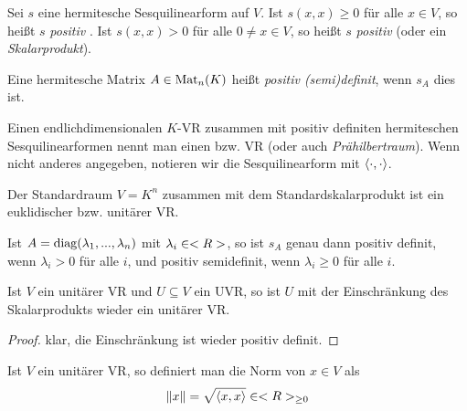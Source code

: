 \begin{definition}
	Sei $s$ eine hermitesche Sesquilinearform auf $V$. Ist $s(x,x)\ge 0$ für alle $x\in V$, so heißt $s$ \emph{positiv} . Ist $s(x,x)>0$ für alle $0\neq x\in V$, so heißt $s$ \emph{positiv}  (oder ein \emph{Skalarprodukt}).
	
	Eine hermitesche Matrix $A\in\operatorname{Mat}_n(K)$ heißt \emph{positiv (semi)definit}, wenn $s_A$ dies ist.
	
	Einen endlichdimensionalen $K$-VR zusammen mit positiv definiten hermiteschen Sesquilinearformen nennt man einen  bzw.  VR (oder auch \emph{Prähilbertraum}). Wenn nicht anderes angegeben, notieren wir die Sesquilinearform mit $\left\langle \cdot,\cdot\right\rangle$.
\end{definition}

\begin{example}
	Der Standardraum $V=K^n$ zusammen mit dem Standardskalarprodukt ist ein euklidischer bzw. unitärer VR.
\end{example}

\begin{example}
	Ist $A=\operatorname{diag}(\lambda_1,...,\lambda_n)$ mit $\lambda_i\in<R>$, so ist $s_A$ genau dann positiv definit, wenn $\lambda_i>0$ für alle $i$, und positiv semidefinit, wenn $\lambda_i\ge 0$ für alle $i$.
\end{example}

\begin{proposition}
	Ist $V$ ein unitärer VR und $U\subseteq V$ ein UVR, so ist $U$ mit der Einschränkung des Skalarprodukts wieder ein unitärer VR.
\end{proposition}
\begin{proof}
	klar, die Einschränkung ist wieder positiv definit.
\end{proof}

\begin{definition}
	Ist $V$ ein unitärer VR, so definiert man die Norm von $x\in V$ als
	\begin{align}
		\Vert x\Vert = \sqrt{\left\langle x,x\right\rangle}\in<R>_{\ge 0}\notag
	\end{align}
\end{definition}

